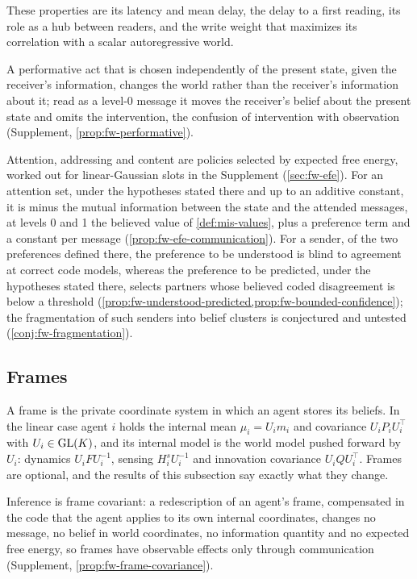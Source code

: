 These properties are its latency and mean delay, the delay to a first reading, its role as a hub between readers, and the write weight that maximizes its correlation with a scalar autoregressive world.

A performative act that is chosen independently of the present state, given the receiver's information, changes the world rather than the receiver's information about it; read as a level-0 message it moves the receiver's belief about the present state and omits the intervention, the confusion of intervention with observation (Supplement, \cref{prop:fw-performative}).

Attention, addressing and content are policies selected by expected free energy, worked out for linear-Gaussian slots in the Supplement (\cref{sec:fw-efe}). For an attention set, under the hypotheses stated there and up to an additive constant, it is minus the mutual information between the state and the attended messages, at levels 0 and 1 the believed value of \cref{def:mis-values}, plus a preference term and a constant per message (\cref{prop:fw-efe-communication}). For a sender, of the two preferences defined there, the preference to be understood is blind to agreement at correct code models, whereas the preference to be predicted, under the hypotheses stated there, selects partners whose believed coded disagreement is below a threshold (\cref{prop:fw-understood-predicted,prop:fw-bounded-confidence}); the fragmentation of such senders into belief clusters is conjectured and untested (\cref{conj:fw-fragmentation}).

\subsection{Frames}\label{sec:fw-frames}

A frame is the private coordinate system in which an agent stores its beliefs. In the linear case agent $i$ holds the internal mean $\mu_i=U_im_i$ and covariance $U_iP_iU_i^\top$ with $U_i\in\mathrm{GL}(K)$, and its internal model is the world model pushed forward by $U_i$: dynamics $U_iFU_i^{-1}$, sensing $H^s_iU_i^{-1}$ and innovation covariance $U_iQU_i^\top$. Frames are optional, and the results of this subsection say exactly what they change.

Inference is frame covariant: a redescription of an agent's frame, compensated in the code that the agent applies to its own internal coordinates, changes no message, no belief in world coordinates, no information quantity and no expected free energy, so frames have observable effects only through communication (Supplement, \cref{prop:fw-frame-covariance}).

